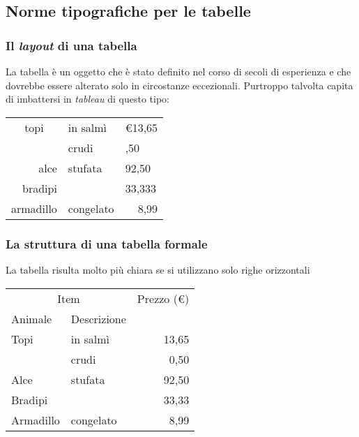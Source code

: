 \subsection{Norme tipografiche per le tabelle}
\begin{frame}
  \frametitle{Il \textit{layout} di una tabella}
	La tabella \`e un oggetto che \`e stato definito nel corso di secoli di esperienza e che dovrebbe essere alterato solo in circostanze eccezionali. Purtroppo talvolta capita di imbattersi in \textit{tableau} di questo tipo: 
	\begin{LaTeXoutput}\centering
		\begin{tabular}{||r|ll||} \hline
		\multicolumn{1}{||c|}{topi}	& in salm\`i	& \euro{}13,65 \\ \cline{2-3}
			& crudi		& ,50 \\ \hline
		alce	& stufata	& 92,50 \\ \cline{1-1} \cline{3-3}
		bradipi	&		& 33,333 \\ \hline
		armadillo & congelato	& \multicolumn{1}{r||}{8,99} \\ \hline
		\end{tabular}
	\end{LaTeXoutput}
\end{frame}
\begin{frame}
  \frametitle{La struttura di una tabella formale}
	La tabella risulta molto pi\`u chiara se si utilizzano solo righe orizzontali
	\begin{LaTeXoutput}\centering
		\begin{tabular}{@{}llr@{}} \hline
		\multicolumn{2}{c}{Item} &  Prezzo (\euro{})\\\cline{1-2}
		Animale & Descrizione	& \\ \hline
		Topi	& in salm\`i	& 13,65 \\ 
			& crudi		& 0,50 \\ 
		Alce	& stufata	& 92,50 \\ 
		Bradipi	&		& 33,33 \\ 
		Armadillo & congelato	& 8,99 \\ \hline
		\end{tabular}
	\end{LaTeXoutput}
\end{frame}
